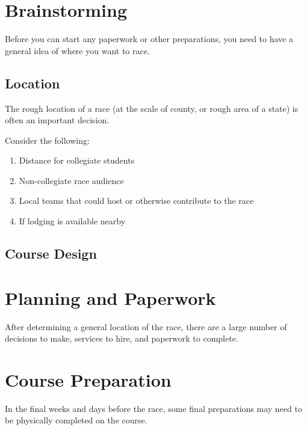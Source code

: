 \documentclass[
  letterpaper, %
  fontsize=10pt, %
  twoside=true,
  chapterentrydots=true, %
  numbers=noenddot,
  fontmethod=tex,
]{kaobook}
\begin{document}
\section{Brainstorming}

Before you can start any paperwork or other preparations,
you need to have a general idea of where you want to race.


\subsection{Location}

The rough location of a race (at the scale of county, or rough area of a state)
is often an important decision.

Consider the following:

\begin{enumerate}
  \item Distance for collegiate students
  \item Non-collegiate race audience
  \item Local teams that could host or otherwise contribute to the race
  \item If lodging is available nearby
\end{enumerate}

\subsection{Course Design}

\section{Planning and Paperwork}

After determining a general location of the race,
there are a large number of decisions to make,
services to hire,
and paperwork to complete.

\section{Course Preparation}

In the final weeks and days before the race,
some final preparations may need to be physically completed on the course.
\end{document}
